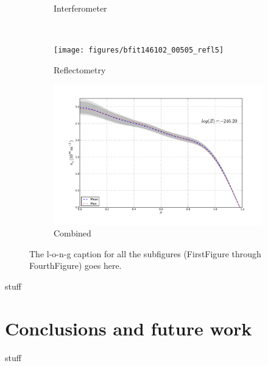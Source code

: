 \documentclass[12pt]{article}
\numberwithin{equation}{section}
\begin{document}
\begin{figure}[h]
\begin{subfigure}[b]{0.5\textwidth}
		\vspace{-30pt}
		\caption{Interferometer}
		\label{fig:inter505}
	\end{subfigure} \\%
	\begin{subfigure}[b]{0.5\textwidth}
		\centering
		\texttt{[image: figures/bfit146102\_00505\_refl5]}
		\vspace{-30pt}
		\caption{Reflectometry}
		\label{fig:refl505}
	\end{subfigure}
	\hspace{-20pt}
	\begin{subfigure}[b]{0.5\textwidth}
		\centering
		\includegraphics[width=\textwidth,keepaspectratio=true]{figures/bfit146102_00505_all5}
		\vspace{-30pt}
		\caption{Combined}
		\label{fig:all505}
	\end{subfigure}
	\caption{The l-o-n-g caption for all the subfigures (FirstFigure through FourthFigure) goes here.}
	\label{fig:dne505}
\end{figure}
stuff
\section{Conclusions and future work}
stuff
\newpage


\end{document}
